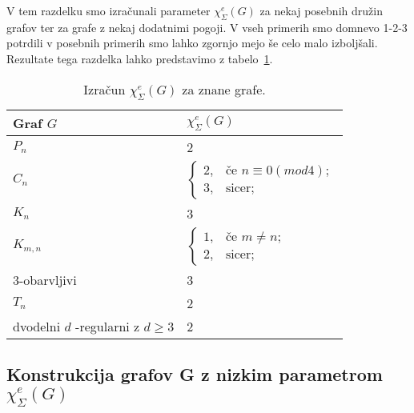 \documentclass[12pt,a4paper,twoside]{article}
\theoremstyle{definition} %
\theoremstyle{plain} %
\newcommand{\ec}{\chi_{\Sigma}^e}
\numberwithin{equation}{section}  %
\begin{document}
V tem razdelku smo izračunali parameter $\ec(G)$ za nekaj posebnih družin grafov ter za grafe z nekaj dodatnimi pogoji. V vseh primerih smo domnevo 1-2-3 potrdili v posebnih primerih smo lahko zgornjo mejo še celo malo izboljšali. Rezultate tega razdelka lahko predstavimo z tabelo~\ref{tab:tab1}.
\begin{table}[h]

\caption{\label{tab:tab1} Izračun $\ec(G)$ za znane grafe. }
\centering
\begin{tabular}{|l|l|}
\hline
 Graf $G$ & $\ec(G)$  \\ \hline
 $P_n$ & 2  \\ \hline
 $C_n$ & $\begin{cases}
	2 ,& \text{če } n \equiv 0 (mod 4);\\ 
	3, & \text{sicer};
	\end{cases}$  \\ \hline
 $K_n$& 3  \\ \hline
 $K_{m,n}$& $\begin{cases}
	1 ,& \text{če } m \neq n;\\ 
	2 ,& \text{sicer};
	\end{cases}$  \\ \hline
 $3$-obarvljivi& 3  \\ \hline
$T_n$ & 2  \\ \hline
dvodelni $d$ -regularni z $d \ge 3 $ & 2  \\ \hline
\end{tabular}
\end{table}

\subsection{Konstrukcija grafov G z nizkim parametrom $\ec(G)$}
\end{document}
